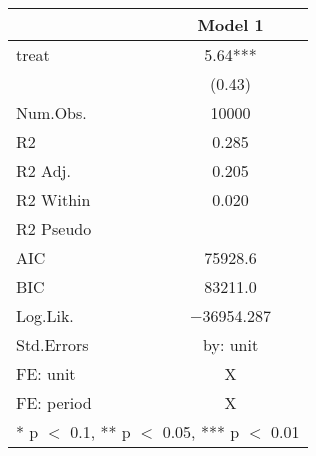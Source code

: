 \begin{table}
\centering
\begin{tabular}[t]{lc}
\toprule
  & Model 1\\
\midrule
treat & \num{5.64}***\\
 & (\num{0.43})\\
\midrule
Num.Obs. & \num{10000}\\
R2 & \num{0.285}\\
R2 Adj. & \num{0.205}\\
R2 Within & \num{0.020}\\
R2 Pseudo & \\
AIC & \num{75928.6}\\
BIC & \num{83211.0}\\
Log.Lik. & \num{-36954.287}\\
Std.Errors & by: unit\\
FE: unit & X\\
FE: period & X\\
\bottomrule
\multicolumn{2}{l}{\rule{0pt}{1em}* p $<$ 0.1, ** p $<$ 0.05, *** p $<$ 0.01}\\
\end{tabular}
\end{table}
